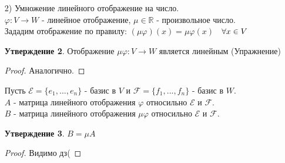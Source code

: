 \documentclass[a4paper, 12pt]{article}
\newcommand{\R}{\mathbb R}
\renewcommand{\phi}{\varphi}
\newcommand\tab[1][.5cm]{\hspace*{#1}}
\theoremstyle{definition}
\newtheorem*{subtheorem}{Утверждение}
\begin{document}
\begin{itemize}
    $A_1$ - матрица линейного отображения $\phi_1$ относильно $\mathcal{E}$ и $\mathcal{F}$. \\
    $A_2$ - матрица линейного отображения $\phi_2$ относильно $\mathcal{E}$ и $\mathcal{F}$. \\
    $B$ - матрица линейного отображения $\phi_1+\phi_2$ относильно $\mathcal{E}$ и $\mathcal{F}$.
    \begin{subtheorem}
      $B=A_1 + A_2$ 
    \end{subtheorem} 
    \begin{proof}
      Размеры совпадают
      $$\phi_1(e_i) = a_{1i}f_1 + \cdots + a_{mi}f_m$$
      $$\phi_2(e_i) = \widetilde{a_{1i}} f_1 + \cdots + \widetilde{a_{mi}} f_m$$ 
      $$(\phi_1 + \phi_2)(e_i) = b_{1i}f_1 + \cdots + b_{mi}f_m$$ 
      $$(\phi_1 + \phi_2)(e_i) = \phi_1(e_i) + \phi_2(e_i) = (a_{1i}f_1 + \cdots + a_{mi}f_m) + (\widetilde{a_{1i}} f_1 + \cdots + \widetilde{a_{mi}} f_m) =$$ $$= (a_{1i} + \widetilde{a_{1i}})f_1 + \cdots + (a_{mi} + \widetilde{a_{mi}})f_m$$
      Т.к. разложение по базису единственное, то
      $$b_{1i} = a_{1i} + \widetilde{a_{1i}} ,..., b_{mi} = a_{mi} + \widetilde{a_{mi}} \Longrightarrow b_{ij} = a_{ij} + \widetilde{a_{ij}} \Longrightarrow B = A_1 + A_2$$ 
    \end{proof} 
    \item[2)] Умножение линейного отображение на число. \\
    $\phi: V \to W$ - линейное отображение, $\mu \in \R$ - произвольное число. \\
    Зададим отображение по правилу: $(\mu \phi)(x) = \mu \phi(x)$ $\tab[0.2cm] \forall x \in V$ 
    \begin{subtheorem}
      Отображение $\mu \phi: V \to W$ является линейным (Упражнение) 
    \end{subtheorem}
    \begin{proof}
      Аналогично.
    \end{proof} 
    Пусть $\mathcal{E}  = \{e_1,...,e_n\}$ - базис в $V$ и $\mathcal{F}  = \{f_1,...,f_n\}$ - базис в $W$. \\
    $A$ - матрица линейного отображения $\phi$ относильно $\mathcal{E}$ и $\mathcal{F}$. \\
    $B$ - матрица линейного отображения $\mu\phi$ относильно $\mathcal{E}$ и $\mathcal{F}$.
    \begin{subtheorem}
      $B=\mu A$ 
    \end{subtheorem} 
    \begin{proof}
      Видимо дз(

\end{proof}
\end{itemize}
\end{document}
